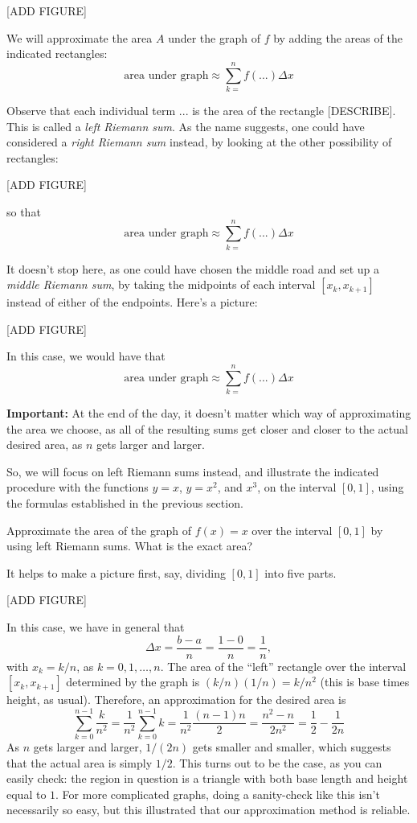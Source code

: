 \documentclass[nooutcomes]{ximera}
\begin{document}
[ADD FIGURE]

We will approximate the area $A$ under the graph of $f$ by adding the areas of the indicated rectangles: $$\mbox{area under graph} \approx \sum_{k=}^n f(...) \Delta x$$

Observe that each individual term $...$ is the area of the rectangle [DESCRIBE]. This is called a \emph{left Riemann sum}. As the name suggests, one could have considered a \emph{right Riemann sum} instead, by looking at the other possibility of rectangles:

[ADD FIGURE]

so that $$\mbox{area under graph} \approx \sum_{k=}^n f(...) \Delta x$$

It doesn't stop here, as one could have chosen the middle road and set up a \emph{middle Riemann sum}, by taking the midpoints of each interval $[x_k,x_{k+1}]$ instead of either of the endpoints. Here's a picture:

[ADD FIGURE]

In this case, we would have that $$\mbox{area under graph} \approx \sum_{k=}^n f(...) \Delta x$$

\begin{callout}
 {\bf Important:} At the end of the day, it doesn't matter which way of approximating the area we choose, as all of the resulting sums get closer and closer to the actual desired area, as $n$ gets larger and larger.  
\end{callout}

So, we will focus on left Riemann sums instead, and illustrate the indicated procedure with the functions $y=x$, $y=x^2$, and $x^3$, on the interval $[0,1]$, using the formulas established in the previous section.

\begin{example}
  Approximate the area of the graph of $f(x) = x$ over the interval $[0,1]$ by using left Riemann sums. What is the exact area?


  \begin{explanation}
    It helps to make a picture first, say, dividing $[0,1]$ into five parts.

    [ADD FIGURE]

    In this case, we have in general that $$\Delta x = \frac{b-a}{n} = \frac{1-0}{n} = \frac{1}{n},$$with $x_k = k/n$, as $k=0,1,\ldots, n$. The area of the ``left'' rectangle over the interval $[x_k,x_{k+1}]$ determined by the graph is $(k/n)(1/n) = k/n^2$ (this is base times height, as usual). Therefore, an approximation for the desired area is $$\sum_{k=0}^{n-1}\frac{k}{n^2} = \frac{1}{n^2}\sum_{k=0}^{n-1} k = \frac{1}{n^2} \frac{(n-1)n}{2} = \frac{n^2-n}{2n^2} = \frac{1}{2} - \frac{1}{2n}$$
As $n$ gets larger and larger, $1/(2n)$ gets smaller and smaller, which suggests that the actual area is simply $1/2$. This turns out to be the case, as you can easily check: the region in question is a triangle with both base length and height equal to $1$. For more complicated graphs, doing a sanity-check like this isn't necessarily so easy, but this illustrated that our approximation method is reliable.    
  \end{explanation}
\end{example}
\end{document}
